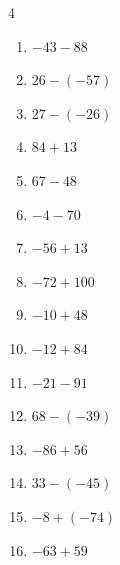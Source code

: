\begin{multicols}{4}
\begin{enumerate}
  \item $-43-88$

        \phantom{$=-131$}

  \item $26-(-57)$

        \phantom{$=83$}

  \item $27-(-26)$

        \phantom{$=53$}

  \item $84+13$

        \phantom{$=97$}

  \item $67-48$

        \phantom{$=19$}

  \item $-4-70$

        \phantom{$=-74$}

  \item $-56+13$

        \phantom{$=-43$}

  \item $-72+100$

        \phantom{$=28$}

  \item $-10+48$

        \phantom{$=38$}

  \item $-12+84$

        \phantom{$=72$}

  \item $-21-91$

        \phantom{$=-112$}

  \item $68-(-39)$

        \phantom{$=107$}

\columnbreak %

\resetques

  \item $-86+56$

        \phantom{$=-30$}

  \item $33-(-45)$

        \phantom{$=78$}

  \item $-8+(-74)$

        \phantom{$=-82$}

  \item $-63+59$


\end{enumerate}
\end{multicols}
